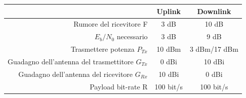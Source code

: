 \documentclass[a4paper]{report} %
\begin{document}
\begin{center}
\begin{tabular}{r|c|c|}
&Uplink&Downlink\\ \hline
Rumore del ricevitore F&3 dB&10 dB\\ \hline
$E_{b} / N_{0}$ necessario&3 dB&9 dB\\ \hline
Trasmettere potenza $P_{Tx}$&10 dBm&3 dBm/17 dBm\\ \hline
Guadagno dell'antenna del trasmettitore $G_{Tx}$&0 dBi&10 dBi\\ \hline
Guadagno dell'antenna del ricevitore $G_{Rx}$&10 dBi&0 dBi\\ \hline
Payload bit-rate R&100 bit/s&100 bit/s\\ \hline
\end{tabular}
\end{center}
 
\end{document}
